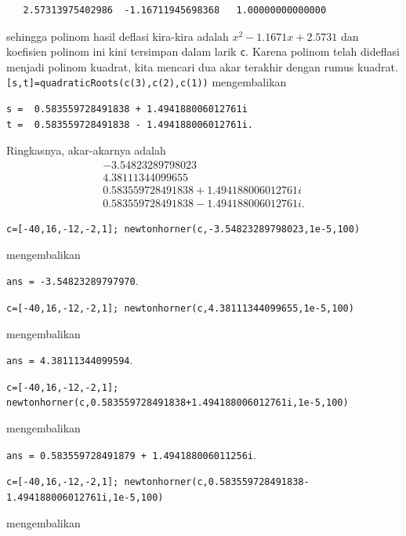 \begin{description}
\begin{verbatim}
   2.57313975402986  -1.16711945698368   1.00000000000000
\end{verbatim} sehingga polinom hasil deflasi kira-kira adalah $x^{2}-1.1671x+2.5731$
dan koefisien polinom ini kini tersimpan dalam larik \texttt{c}. Karena
polinom telah dideflasi menjadi polinom kuadrat, kita mencari dua
akar terakhir dengan rumus kuadrat. \texttt{{[}s,t{]}=quadraticRoots(c(3),c(2),c(1))}
mengembalikan \begin{verbatim}
s =  0.583559728491838 + 1.494188006012761i
t =  0.583559728491838 - 1.494188006012761i.
\end{verbatim} Ringkasnya, akar-akarnya adalah 
\[
\begin{gathered}-3.54823289798023\\
4.38111344099655\\
0.583559728491838+1.494188006012761i\\
0.583559728491838-1.494188006012761i.
\end{gathered}
\]

\item [{\ref{exc:polynomials-18}a:}] \texttt{c={[}-40,16,-12,-2,1{]};
newtonhorner(c,-3.54823289798023,1e-5,100)}

\begin{center}
mengembalikan 
\par\end{center}

\texttt{ans = -3.54823289797970}.

\texttt{c={[}-40,16,-12,-2,1{]}; newtonhorner(c,4.38111344099655,1e-5,100)}

\begin{center}
mengembalikan 
\par\end{center}

\texttt{ans = 4.38111344099594}.

\texttt{c={[}-40,16,-12,-2,1{]}; newtonhorner(c,0.583559728491838+1.494188006012761i,1e-5,100)}

\begin{center}
mengembalikan 
\par\end{center}

\texttt{ans = 0.583559728491879 + 1.494188006011256i}.

\texttt{c={[}-40,16,-12,-2,1{]}; newtonhorner(c,0.583559728491838-1.494188006012761i,1e-5,100)}

\begin{center}
mengembalikan 
\par\end{center}


\end{description}
